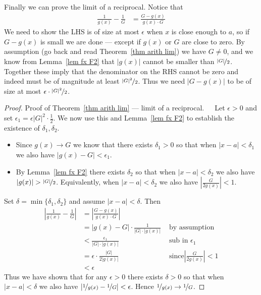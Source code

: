Finally we can prove the limit of a reciprocal. Notice that
\begin{align*}
  \frac{1}{g(x)} - \frac{1}{G} &= \frac{G-g(x)}{g(x) \cdot G}
\end{align*}
We need to show the LHS is of size at most $\epsilon$ when $x$ is close enough to $a$,
 so if $G-g(x)$ is small we are done --- except if $g(x)$ or $G$ are close to zero. By assumption
(go back and read Theorem~\ref{thm arith lim}) we have $G \neq 0$, and we know from
Lemma~\ref{lem fx F2} that $|g(x)|$ cannot be smaller than $\nicefrac{|G|}{2}$.
Together these imply that the denominator on the RHS cannot be zero and indeed must be
of magnitude at least $\nicefrac{|G|^2}{2}$. Thus we need $|G-g(x)|$ to be of size at most
$\epsilon \cdot \nicefrac{|G|^2}{2}$.
\begin{proof}{Proof of Theorem~\ref{thm arith lim} --- limit of a reciprocal.}\ \ \
 Let $\epsilon>0$ and set $\epsilon_1 = \epsilon|G|^2 \cdot \frac{1}{2}$. We
now use this and Lemma~\ref{lem fx F2} to establish the existence of $\delta_1,
\delta_2$.
\begin{itemize}
 \item Since $g(x) \to G$ we know that there exists $\delta_1>0$ so that when
$|x-a|<\delta_1$ we also have $|g(x)-G|<\epsilon_1$.
 \item By Lemma~\ref{lem fx F2} there exists $\delta_2$ so that when
$|x-a|<\delta_2$ we also have $|g(x)|>\nicefrac{|G|}{2}$. Equivalently,
when $|x-a|<\delta_2$ we also have $\left|\frac{G}{2g(x)}\right|<1$.
\end{itemize}


Set $\delta = \min\{\delta_1,\delta_2\}$ and assume $|x-a|<\delta$. Then
\begin{align*}
  \left| \frac{1}{g(x)} - \frac{1}{G} \right|
  &= \left| \frac{G - g(x)}{g(x) \cdot G} \right| \\
  &= |g(x) - G| \cdot \frac{1}{|G|\cdot |g(x)|} & \text{ by assumption}
\\
  & < \frac{\epsilon_1}{|G| \cdot |g(x)|} & \text{ sub in $\epsilon_1$} \\
  & = \epsilon \cdot \frac{|G|}{2  |g(x)|} & \text{ since
$\left|\frac{G}{2g(x)}\right|<1$}\\
  & < \epsilon
\end{align*}
Thus we have shown that for any $\epsilon>0$ there exists $\delta>0$ so that
when $|x-a|<\delta$ we also have $|\nicefrac{1}{g(x)} -
\nicefrac{1}{G}|<\epsilon$. Hence $\nicefrac{1}{g(x)} \to \nicefrac{1}{G}$.

\end{proof}

